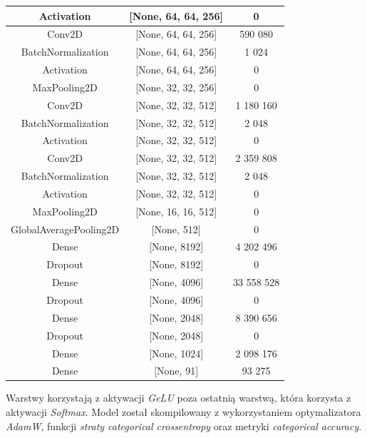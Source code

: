 \begin{table}[htbp]
\begin{tabular}{|c|c|c|}
        \hline
        Activation & [None, 64, 64, 256] & 0 \\
        \hline
        Conv2D & [None, 64, 64, 256] & 590 080 \\
        \hline
        BatchNormalization & [None, 64, 64, 256] & 1 024 \\
        \hline
        Activation & [None, 64, 64, 256] & 0 \\
        \hline
        MaxPooling2D & [None, 32, 32, 256] & 0 \\
        \hline
        Conv2D & [None, 32, 32, 512] & 1 180 160 \\
        \hline
        BatchNormalization & [None, 32, 32, 512] & 2 048 \\
        \hline
        Activation & [None, 32, 32, 512] & 0 \\
        \hline
        Conv2D & [None, 32, 32, 512] & 2 359 808 \\
        \hline
        BatchNormalization & [None, 32, 32, 512] & 2 048 \\
        \hline
        Activation & [None, 32, 32, 512] & 0 \\
        \hline
        MaxPooling2D & [None, 16, 16, 512] & 0 \\
        \hline
        GlobalAveragePooling2D & [None, 512] & 0 \\
        \hline
        Dense & [None, 8192] & 4 202 496 \\
        \hline
        Dropout & [None, 8192] & 0 \\
        \hline
        Dense & [None, 4096] & 33 558 528 \\
        \hline
        Dropout & [None, 4096] & 0 \\
        \hline
        Dense & [None, 2048] & 8 390 656 \\
        \hline
        Dropout & [None, 2048] & 0 \\
        \hline
        Dense & [None, 1024] & 2 098 176 \\
        \hline
        Dense & [None, 91] & 93 275 \\
        \hline
    \end{tabular}
\end{table}
Warstwy korzystają z aktywacji \textit{GeLU} poza ostatnią warstwą, która korzysta z aktywacji \textit{Softmax}. Model został skompilowany z wykorzystaniem optymalizatora \textit{AdamW}, funkcji \textit{straty categorical crossentropy} oraz metryki \textit{categorical accuracy}. \\

